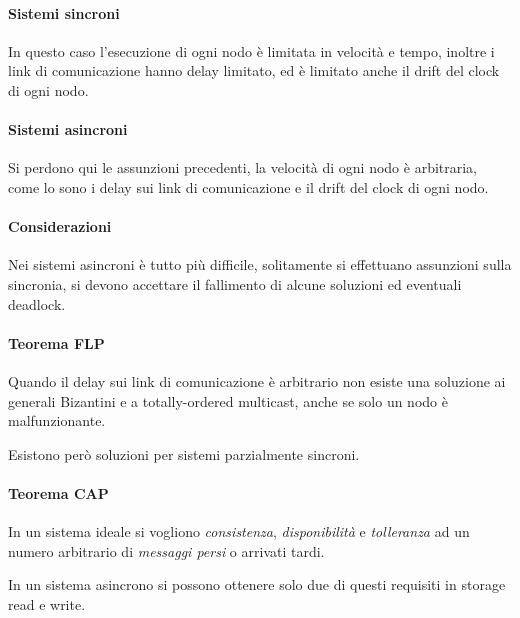 \paragraph{Sistemi sincroni}
In questo caso l'esecuzione di ogni nodo è limitata in velocità 
e tempo, inoltre i link di comunicazione hanno delay limitato, 
ed è limitato anche il drift del clock di ogni nodo.

\paragraph{Sistemi asincroni}
Si perdono qui le assunzioni precedenti, 
la velocità di ogni nodo è arbitraria, come lo sono 
i delay sui link di comunicazione e il drift del clock di ogni nodo.

\paragraph{Considerazioni}
Nei sistemi asincroni è tutto più difficile, solitamente si 
effettuano assunzioni sulla sincronia, si devono accettare 
il fallimento di alcune soluzioni ed eventuali deadlock.

\paragraph{Teorema FLP}
Quando il delay sui link di comunicazione è arbitrario 
non esiste una soluzione ai generali Bizantini e a totally-ordered
multicast, anche se solo un nodo è malfunzionante.

Esistono però soluzioni per sistemi parzialmente sincroni.

\paragraph{Teorema CAP}
In un sistema ideale si vogliono \emph{consistenza}, \emph{disponibilità} 
e \emph{tolleranza} ad un numero arbitrario di \emph{messaggi persi} o 
arrivati tardi.

In un sistema asincrono si possono ottenere solo due 
di questi requisiti in storage read e write.